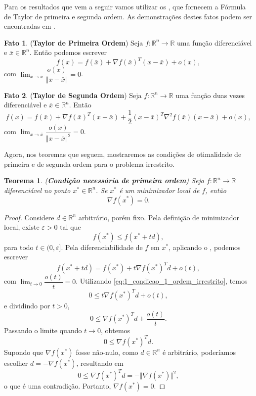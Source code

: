 \documentclass[12pt,a4paper]{scrartcl}
\def\RR{\mathds{R}}
\def\xbar{\bar{x}}
\newtheorem{teo}{Teorema}
\theoremstyle{definition}%
\newtheorem{fato}{Fato}
\begin{document}
Para os resultados que vem a seguir vamos utilizar os , que fornecem a Fórmula de Taylor de primeira e segunda ordem. As demonstrações destes fatos podem ser encontradas em \textcite[p.194]{Elon2019}.


\begin{fato}(\textbf{Taylor de Primeira Ordem}) \label{fato:Taylor_primeira_ordem}
Seja $f:\RR^{n} \rightarrow \RR$ uma função diferenciável e $\xbar \in \RR^{n}$. Então podemos escrever
\[
f(x) = f(\xbar) + \nabla f(\xbar)^{T}(x-\xbar) + o(x),
\]
com $\displaystyle\lim_{x \rightarrow \xbar}\dfrac{o(x)}{\Vert x-\xbar \Vert} = 0$.
\end{fato}

\begin{fato}(\textbf{Taylor de Segunda Ordem}) \label{fato:Taylor_segunda_ordem}
Seja $f:\RR^{n} \rightarrow \RR$ uma função duas vezes diferenciável e $\xbar \in \RR^{n}$. Então
\[
f(x) = f(\xbar) + \nabla f(\xbar)^{T}(x-\xbar) + \dfrac{1}{2}(x-\xbar)^{T}\nabla^{2} f(\xbar)(x-\xbar) + o(x),
\] 
com $\displaystyle\lim_{x \rightarrow \xbar}\dfrac{o(x)}{\Vert x - \xbar \Vert^{2}} = 0$. 
\end{fato}

Agora, nos teoremas que seguem, mostraremos as condições de otimalidade de primeira e de segunda ordem para o problema irrestrito.

\begin{teo}(\textbf{Condição necessária de primeira ordem}) \label{teo:condicao_necessaria_1_ordem}
Seja $f:\RR^{n} \rightarrow \RR$ diferenciável no ponto $x^{*} \in \RR^{n}$. Se $x^{*}$ é um minimizador local de $f$, então
\[ \label{eq:condicao_necessaria_1_ordem}
\nabla f(x^{*}) = 0.
\]
\end{teo}
\begin{proof}
Considere $d \in \RR^{n}$ arbitrário, porém fixo. Pela definição de minimizador local, existe $\varepsilon > 0$ tal que 
\[ \label{eq:1_condicao_1_ordem_irrestrito}
f(x^{*}) \leq f(x^{*}+td),
\]
para todo $t\in (0,\varepsilon ]$. Pela diferenciabilidade de $f$ em $x^{*}$, aplicando o , podemos escrever 
\[
f(x^{*}+td) = f(x^{*}) + t\nabla f(x^{*})^{T}d + o(t),
\] 
com $\displaystyle\lim_{t\rightarrow 0} \dfrac{o(t)}{t} =0$. Utilizando \eqref{eq:1_condicao_1_ordem_irrestrito}, temos
\[
0 \leq t\nabla f(x^{*})^{T}d + o(t),
\]
e dividindo por $t>0$, 
\[
0 \leq \nabla f(x^{*})^{T}d + \dfrac{o(t)}{t} .
\]
Passando o limite quando $t\rightarrow 0$, obtemos
\[
0 \leq \nabla f(x^{*})^{T}d .
\]
Supondo que $\nabla f(x^{*})$ fosse não-nulo, como $d \in \RR^{n}$ é arbitrário, poderíamos escolher $d=-\nabla f(x^{*})$, resultando em
\[
0 \leq \nabla f(x^{*})^{T}d = - \Vert \nabla f(x^{*}) \Vert^{2} ,
\]
o que é uma contradição. Portanto, $\nabla f(x^{*}) =0$.
\end{proof}
\end{document}
